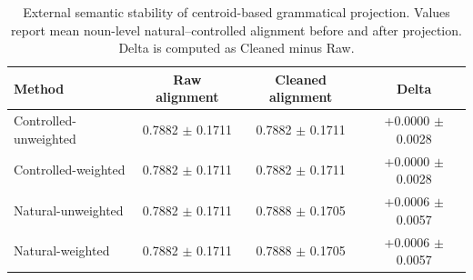 \begin{table}[t]
\centering
\small
\caption{External semantic stability of centroid-based grammatical projection. Values report mean noun-level natural--controlled alignment before and after projection. Delta is computed as Cleaned minus Raw.}
\label{tab:external_semantic_stability}
\begin{tabular}{lccc}
\toprule
Method & Raw alignment & Cleaned alignment & Delta \\
\midrule
Controlled-unweighted & 0.7882 $\pm$ 0.1711 & 0.7882 $\pm$ 0.1711 & +0.0000 $\pm$ 0.0028 \\
Controlled-weighted & 0.7882 $\pm$ 0.1711 & 0.7882 $\pm$ 0.1711 & +0.0000 $\pm$ 0.0028 \\
Natural-unweighted & 0.7882 $\pm$ 0.1711 & 0.7888 $\pm$ 0.1705 & +0.0006 $\pm$ 0.0057 \\
Natural-weighted & 0.7882 $\pm$ 0.1711 & 0.7888 $\pm$ 0.1705 & +0.0006 $\pm$ 0.0057 \\
\bottomrule
\end{tabular}
\end{table}